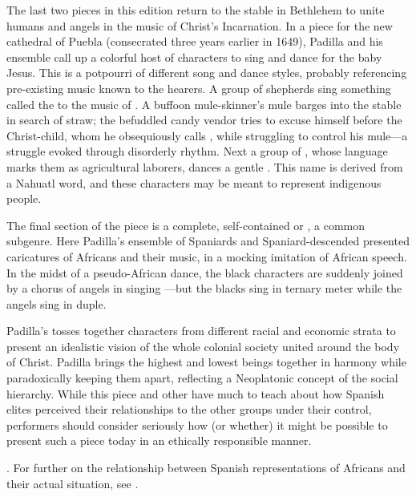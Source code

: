 The last two pieces in this edition return to the stable in Bethlehem to unite humans and angels in the music of Christ's Incarnation.
In a piece for the new cathedral of Puebla (consecrated three years earlier in 1649), Padilla and his ensemble call up a colorful host of characters  to sing and dance for the baby Jesus.
This  is a potpourri of different song and dance styles, probably referencing pre-existing music known to the hearers.
A group of shepherds sing something called the  to the music of .
A buffoon mule-skinner's mule barges into the stable in search of straw; the befuddled candy vendor tries to excuse himself before the Christ-child, whom he obsequiously calls , while struggling to control his mule---a struggle evoked through disorderly rhythm.
Next a group of , whose language marks them as agricultural laborers, dances a gentle .
This name is derived from a Nahuatl word, and these characters may be meant to represent indigenous people.

The final section of the piece is a complete, self-contained  or , a common subgenre.
Here Padilla's ensemble of Spaniards and Spaniard-descended  presented caricatures of Africans and their music, in a mocking imitation of African speech.
In the midst of a pseudo-African dance, the black characters are suddenly joined by a chorus of angels in singing ---but the blacks sing in ternary meter while the angels sing in duple.

Padilla's  tosses together characters from different racial and economic strata to present an idealistic vision of the whole colonial society united around the body of Christ.
Padilla brings the highest and lowest beings together in harmony while paradoxically keeping them apart, reflecting a Neoplatonic concept of the social hierarchy.
While this piece and other  have much to teach about how Spanish elites perceived their relationships to the other groups under their control, performers should consider seriously how (or whether) it might be possible to present such a piece today in an ethically responsible manner.%
  \begin{Footnote}
  \autocites{Baker:EthnicVC}{Baker:PerformancePostColonial}. 
  For further on the relationship between Spanish representations of Africans and their actual situation, see \autocites{Molinero:Negros}{Lipski:AfroHispanic}
  {Fromont:DancingKingCongo}.
  \end{Footnote}

